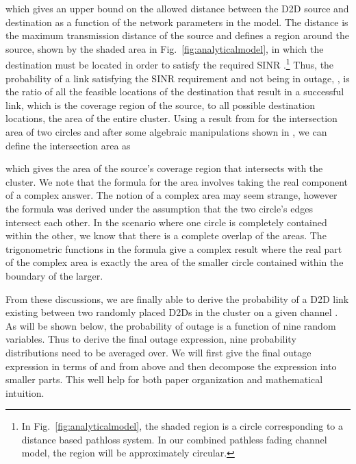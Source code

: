 \documentclass[10pt, final, journal, letterpaper,oneside, twocolumn]{IEEEtran}
\begin{document}
which gives an upper bound on the allowed distance between the D2D source and destination as a function of the network parameters in the model.  The distance  is the maximum transmission distance of the source and defines a region around the source, shown by the shaded area in Fig.~\ref{fig:analyticalmodel}, in which the destination must be located in order to satisfy the required SINR .\footnote{In Fig.~\ref{fig:analyticalmodel}, the shaded region is a circle corresponding to a distance based pathloss system.  In our combined pathless fading channel model, the region will be approximately circular.}  Thus, the probability of a link satisfying the SINR requirement and not being in outage, , is the ratio of all the feasible locations of the destination that result in a successful link, which is the coverage region of the source, to all possible destination locations, the area of the entire cluster.  Using a result from \cite{geometry_prob} for the intersection area of two circles and after some algebraic manipulations shown in \cite{bkaufman_t1}, we can define the intersection area  as

which gives the area of the source's coverage region that intersects with the cluster.  We note that the formula for the area involves taking the real component of a complex answer.  The notion of a complex area may seem strange, however the formula was derived under the assumption that the two circle's edges intersect each other.  In the scenario where one circle is completely contained within the other, we know that there is a complete overlap of the areas.  The trigonometric functions in the formula give a complex result where the real part of the complex area is exactly the area of the smaller circle contained within the boundary of the larger.  

From these discussions, we are finally able to derive the probability of a D2D link existing between two randomly placed D2Ds in the cluster on a given channel .  As will be shown below, the probability of outage  is a function of nine random variables.  Thus to derive the final outage expression, nine probability distributions need to be averaged over.  We will first give the final outage expression in terms of  and  from above and then decompose the expression into smaller parts.  This well help for both paper organization and mathematical intuition.  
\end{document}
